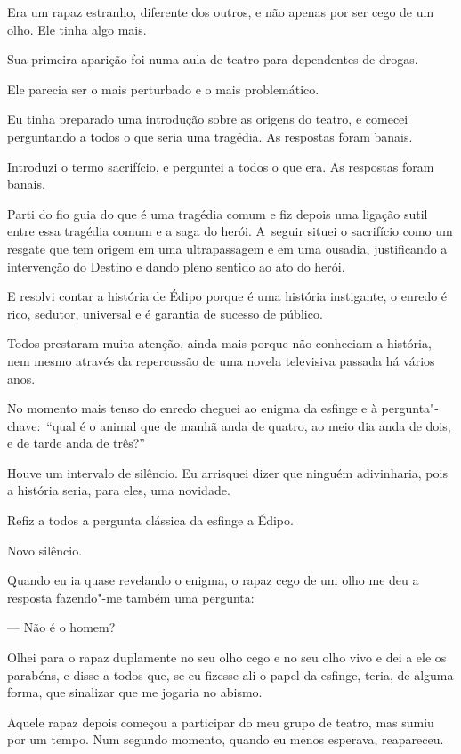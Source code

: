  

Era um rapaz estranho, diferente dos outros, e não apenas por ser cego
de um olho. Ele tinha algo mais.

Sua primeira aparição foi numa aula de teatro para dependentes de
drogas.

Ele parecia ser o mais perturbado e o mais problemático.

Eu tinha preparado uma introdução sobre as origens do teatro, e comecei
perguntando a todos o que seria uma tragédia. As respostas foram banais.

Introduzi o termo sacrifício, e perguntei a todos o que era. As
respostas foram banais.

Parti do fio guia do que é uma tragédia comum e fiz depois uma ligação
sutil entre essa tragédia comum e a saga do herói. A~seguir situei o
sacrifício como um resgate que tem origem em uma ultrapassagem e em uma
ousadia, justificando a intervenção do Destino e dando pleno sentido ao
ato do herói.

E resolvi contar a história de Édipo porque é uma história instigante, o
enredo é rico, sedutor, universal e é garantia de sucesso de público.

Todos prestaram muita atenção, ainda mais porque não conheciam a
história, nem mesmo através da repercussão de uma novela televisiva
passada há vários anos.

No momento mais tenso do enredo cheguei ao enigma da esfinge e à
pergunta"-chave:~``qual é o animal que de manhã anda de quatro, ao meio
dia anda de dois, e de tarde anda de três?''

Houve um intervalo de silêncio. Eu arrisquei dizer que ninguém
adivinharia, pois a história seria, para eles, uma novidade.

Refiz a todos a pergunta clássica da esfinge a Édipo.

Novo silêncio.

Quando eu ia quase revelando o enigma, o rapaz cego de um olho me deu a
resposta fazendo"-me também uma pergunta:

— Não é o homem?

Olhei para o rapaz duplamente no seu olho cego e no seu olho vivo e dei
a ele os parabéns, e disse a todos que, se eu fizesse ali o papel da
esfinge, teria, de alguma forma, que sinalizar que me jogaria no abismo.

\asterisc{}

Aquele rapaz depois começou a participar do meu grupo de teatro, mas
sumiu por um tempo. Num segundo momento, quando eu menos esperava,
reapareceu.

